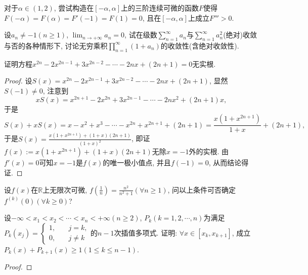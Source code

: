 \begin{quizb}
\woe 对于\(\alpha\in (1,2)\), 尝试构造在\([-\alpha,\alpha]\)上的三阶连续可微的函数\(F\)使得\(F(-\alpha)=F(\alpha)=F'(-1)=F(1)=0\), 且在\([-\alpha,\alpha]\)上成立\(F'''>0.\)
\begin{solution}

\end{solution}
\woe 设\(a_n\ne -1(n\geqslant 1)\), \(\lim_{n\rightarrow+\infty}a_n=0\), 试在级数\(\sum_{n=1}^{\infty}a_n\)与\(\sum_{n=1}^{\infty}a_n^2\)(绝对)收敛与否的各种情形下, 讨论无穷乘积\(\prod_{n=1}^{\infty}(1+a_n)\)的收敛性(含绝对收敛性).
\begin{solution}

\end{solution}
\woe 证明方程\(x^{2n}-2x^{2n-1}+3x^{2n-2}-\cdots-2nx+(2n+1)=0\)无实根.
\begin{proof}
设\(S(x)=x^{2n}-2x^{2n-1}+3x^{2n-2}-\cdots-2nx+(2n+1)\), 显然\(S(-1)\ne 0\), 注意到\[xS(x)=x^{2n+1}-2x^{2n}+3x^{2n-1}-\cdots-2nx^2+(2n+1)x,\]于是\[S(x)+xS(x)=x-x^2+x^3-\cdots-x^{2n}+x^{2n+1}+(2n+1)=\frac{x\left(1+x^{2n+1}\right)}{1+x}+(2n+1),\]于是\(S(x)=\frac{x(1+x^{2n+1})+(1+x)(2n+1)}{(1+x)^2}\), 即证\(f(x):=x(1+x^{2n+1})+(1+x)(2n+1)\)无除\(x=-1\)外的实根. 由\(f'(x)=0\)可知\(x=-1\)是\(f(x)\)的唯一极小值点, 并且\(f(-1)=0\), 从而结论得证.
\end{proof}
\woe 设\(f(x)\)在\(\mathbb{R}\)上无限次可微, \(f\left(\frac{1}{n}\right)=\frac{n^2}{n^2+1}(\forall n\geqslant1)\), 问以上条件可否确定\(f^{(k)}(0)(\forall k\geqslant 0)\)?
\begin{solution}

\end{solution}
\woe 设\(-\infty<x_1<x_2<\cdots<x_n<+\infty(n\geqslant 2)\), \(P_k(k=1,2,\cdots,n)\)为满足\(P_k(x_j)=\begin{cases}
1,\quad&j=k,\\0,&j\ne k
\end{cases}\)的\(n-1\)次插值多项式. 证明: \(\forall x\in[x_k,x_{k+1}]\), 成立\(P_k(x)+P_{k+1}(x)\geqslant 1(1\leqslant k\leqslant n-1)\).
\begin{proof}
	
\end{proof}
\end{quizb}
